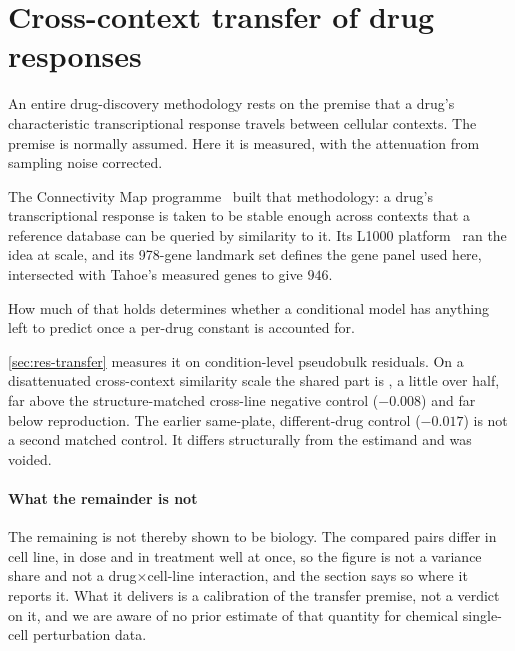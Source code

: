 \section{Cross-context transfer of drug responses}
\label{sec:lit-cmap}
\framedecl{-}

\begin{question}
An entire drug-discovery methodology rests on the premise that a drug's
characteristic transcriptional response travels between cellular contexts. The
premise is normally assumed. Here it is measured, with the attenuation from
sampling noise corrected.
\end{question}

\noindent
The Connectivity Map programme~\cite{cmap,l1000} built that methodology: a drug's
transcriptional response is taken to be stable enough across contexts that a
reference database can be queried by similarity to it. Its L1000
platform~\cite{l1000} ran the idea at scale, and its 978-gene landmark set
defines the gene panel used here, intersected with Tahoe's measured genes to give
$946$.

How much of that holds determines whether a conditional model has anything left
to predict once a per-drug constant is accounted for.

\cref{sec:res-transfer} measures it on condition-level pseudobulk residuals. On a
disattenuated cross-context similarity scale the shared part is
, a little over half, far above the
structure-matched cross-line negative control ($-0.008$) and far below
reproduction. The earlier same-plate, different-drug control ($-0.017$) is not a
second matched control. It differs structurally from the estimand and was
voided.

\paragraph{What the remainder is not} The remaining 
is not thereby shown to be biology. The compared pairs differ in cell line, in
dose and in treatment well at once, so the figure is not a variance share and not
a drug$\times$cell-line interaction, and the section says so where it reports it.
What it delivers is a calibration of the transfer premise, not a verdict on it,
and we are aware of no prior estimate of that quantity for chemical single-cell
perturbation data.

